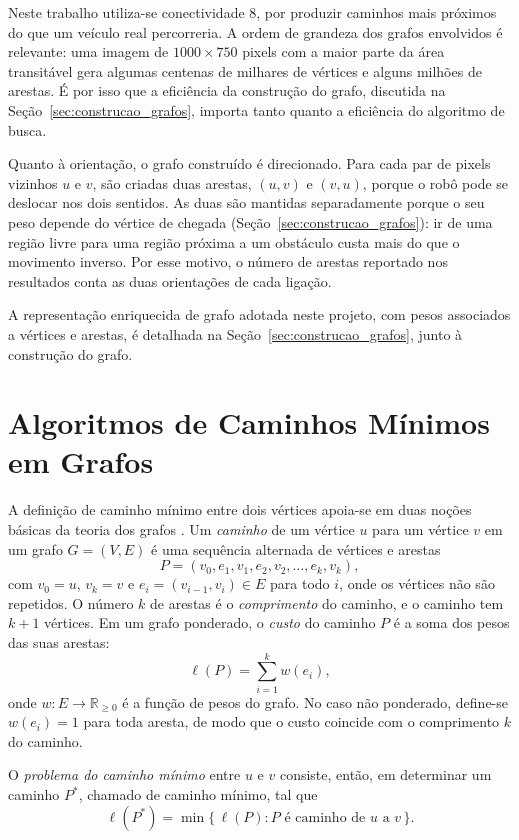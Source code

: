 \documentclass[
    12pt,
    openright,
    oneside,
    a4paper,
    english,
    brazil
]{abntex2}
\begin{document}
Neste trabalho utiliza-se conectividade 8, por produzir caminhos mais próximos do que um veículo real percorreria. A ordem de grandeza dos grafos envolvidos é relevante: uma imagem de $1000 \times 750$ pixels com a maior parte da área transitável gera algumas centenas de milhares de vértices e alguns milhões de arestas. É por isso que a eficiência da construção do grafo, discutida na Seção~\ref{sec:construcao_grafos}, importa tanto quanto a eficiência do algoritmo de busca.

Quanto à orientação, o grafo construído é direcionado. Para cada par de pixels vizinhos $u$ e $v$, são criadas duas arestas, $(u, v)$ e $(v, u)$, porque o robô pode se deslocar nos dois sentidos. As duas são mantidas separadamente porque o seu peso depende do vértice de chegada (Seção~\ref{sec:construcao_grafos}): ir de uma região livre para uma região próxima a um obstáculo custa mais do que o movimento inverso. Por esse motivo, o número de arestas reportado nos resultados conta as duas orientações de cada ligação.

A representação enriquecida de grafo adotada neste projeto, com pesos associados a vértices e arestas, é detalhada na Seção~\ref{sec:construcao_grafos}, junto à construção do grafo.

\section{Algoritmos de Caminhos Mínimos em Grafos}
\label{sec:caminhos_minimos}

A definição de caminho mínimo entre dois vértices apoia-se em duas noções básicas da teoria dos grafos \cite{deo2016, chen1997}. Um \emph{caminho} de um vértice $u$ para um vértice $v$ em um grafo $G = (V, E)$ é uma sequência alternada de vértices e arestas
\[
P = (v_0, e_1, v_1, e_2, v_2, \ldots, e_k, v_k),
\]
com $v_0 = u$, $v_k = v$ e $e_i = (v_{i-1}, v_i) \in E$ para todo $i$, onde os vértices não são repetidos. O número $k$ de arestas é o \emph{comprimento} do caminho, e o caminho tem $k+1$ vértices. Em um grafo ponderado, o \emph{custo} do caminho $P$ é a soma dos pesos das suas arestas:
\[
\ell(P) = \sum_{i=1}^{k} w(e_i),
\]
onde $w : E \to \mathbb{R}_{\geq 0}$ é a função de pesos do grafo. No caso não ponderado, define-se $w(e_i) = 1$ para toda aresta, de modo que o custo coincide com o comprimento $k$ do caminho.

O \emph{problema do caminho mínimo} entre $u$ e $v$ consiste, então, em determinar um caminho $P^\ast$, chamado de caminho mínimo, tal que
\[
\ell(P^\ast) = \min \{\, \ell(P) : P \text{ é caminho de } u \text{ a } v \,\}.
\]
\end{document}
